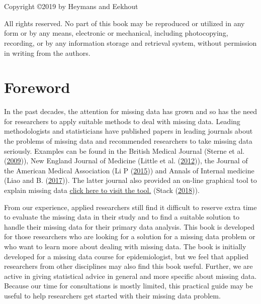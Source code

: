 \documentclass[
]{book}
\author{}
\date{\vspace{-2.5em}2020-03-04}
\begin{document}
\frontmatter

\mainmatter
\hypertarget{section}{%
\chapter*{}\label{section}}

Copyright ©2019 by Heymans and Eekhout

All rights reserved. No part of this book may be reproduced or utilized
in any form or by any means, electronic or mechanical, including
photocopying, recording, or by any information storage and retrieval
system, without permission in writing from the authors.

\hypertarget{foreword}{%
\chapter*{Foreword}\label{foreword}}

In the past decades, the attention for missing data has grown and so has
the need for researchers to apply suitable methods to deal with missing
data. Leading methodologists and statisticians have published papers in
leading journals about the problems of missing data and recommended
researchers to take missing data seriously. Examples can be found in the
British Medical Journal (Sterne et al.
(\protect\hyperlink{ref-sterne2009multiple}{2009})), New England Journal
of Medicine (Little et al.
(\protect\hyperlink{ref-little2012prevention}{2012})), the Journal of
the American Medical Association (Li P
(\protect\hyperlink{ref-Li2015}{2015})) and Annals of Internal medicine
(Liao and B. (\protect\hyperlink{ref-Liao2017}{2017})). The latter
journal also provided an on-line graphical tool to explain missing data
\href{http://labs.annals.org/missingdata/}{click here to visit the
tool.} (Stack (\protect\hyperlink{ref-Stack2018}{2018})).

From our experience, applied researchers still find it difficult to
reserve extra time to evaluate the missing data in their study and to
find a suitable solution to handle their missing data for their primary
data analysis. This book is developed for those researchers who are
looking for a solution for a missing data problem or who want to learn
more about dealing with missing data. The book is initially developed
for a missing data course for epidemiologist, but we feel that applied
researchers from other disciplines may also find this book useful.
Further, we are active in giving statistical advice in general and more
specific about missing data. Because our time for consultations is
mostly limited, this practical guide may be useful to help researchers
get started with their missing data problem.
\end{document}
